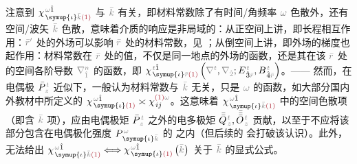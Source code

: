 注意到 $\chi^{\;\! \mathcolor{gray}{\omega} \hat{1}}_{\;\! \symup{\iota} \mathcolor{gray}{\bar{k}} \textcolor{Maroon}{(1)}}$ 与 $\mathcolor{gray}{\bar{k}}$ 有关，即材料常数除了有时间/角频率 $\mathcolor{gray}{\omega}$ 色散外，还有空间/波矢 $\mathcolor{gray}{\bar{k}}$ 色散，意味着介质的响应是非局域的：从正空间上讲，即长程相互作用：$\mathcolor{gray}{\bar{r}'}$ 处的外场可以影响 $\mathcolor{gray}{\bar{r}}$ 处的材料常数，见 ；从倒空间上讲，即外场的梯度也起作用：材料常数在 $\mathcolor{gray}{\bar{r}}$ 处的值，不仅是同一地点的外场的函数，还是其在该 $\mathcolor{gray}{\bar{r}}$ 处的空间各阶导数 $\mathcolor{gray}{\nabla^n_{\hat{1}}}$ 的函数，即 $\chi^{\;\! \mathcolor{gray}{t} \hat{1}}_{\;\! \symup{\iota} \mathcolor{gray}{\bar{r}} \textcolor{Maroon}{(1)}} \left( \mathcolor{gray}{\nabla^t}, \mathcolor{gray}{\nabla_{\hat{2}}} ; E^{\;\!\mathcolor{gray}{t}}_{\;\! \hat{3}\mathcolor{gray}{\bar{r}}}, B^{\;\!\mathcolor{gray}{t}}_{\;\! \hat{4}\mathcolor{gray}{\bar{r}}} \right)$。—— 然而，在电偶极 $\bar{P}^{\;\!\mathcolor{gray}{t}}_{\;\!\mathcolor{gray}{z}}$ 近似下，一般认为材料常数与 $\mathcolor{gray}{\bar{k}}$ 无关，只是 $\mathcolor{gray}{\omega}$ 的函数，如大部分国内外教材中所定义的 $\chi^{\;\! \mathcolor{gray}{\omega} \hat{1}}_{\;\! \symup{\iota} \textcolor{Maroon}{(1)}} \asymp \chi^{ \textcolor{Maroon}{(1)} \mathcolor{gray}{\omega}}_{\;\! ij}$。这意味着 $\chi^{\;\! \mathcolor{gray}{\omega} \hat{1}}_{\;\! \symup{\iota} \mathcolor{gray}{\bar{k}} \textcolor{Maroon}{(1)}}$ 中的空间色散项（即含 $\mathcolor{gray}{\bar{k}}$ 项），应由电偶极矩 $\bar{P}^{\;\!\mathcolor{gray}{t}}_{\;\!\mathcolor{gray}{z}}$ 之外的电多极矩 $\bar{\bar{Q}}^{\;\!\mathcolor{gray}{t}}_{\;\!\mathcolor{gray}{z}},\bar{\bar{\bar{O}}}^{\;\!\mathcolor{gray}{t}}_{\;\!\mathcolor{gray}{z}}$ 贡献\cite{shenNonlinearOpticalSusceptibilities2001}，以至于不应将该部分包含在电偶极化强度 $P^{\;\!\mathcolor{gray}{\omega}}_{\;\! \symup{\iota}\mathcolor{gray}{\bar{k}}}$ 的  之内（但后续的  会打破该认识）。此外， 无法给出 $\chi^{\;\! \mathcolor{gray}{\omega} \hat{1}}_{\;\! \symup{\iota} \mathcolor{gray}{\bar{k}} \textcolor{Maroon}{(1)}} \Longleftrightarrow \chi^{\;\! \mathcolor{gray}{\omega} \hat{1}}_{\;\! \symup{\iota} \textcolor{Maroon}{(1)}} \left( \mathcolor{gray}{\bar{k}} \right)$ 关于 $\mathcolor{gray}{\bar{k}}$ 的显式公式。

